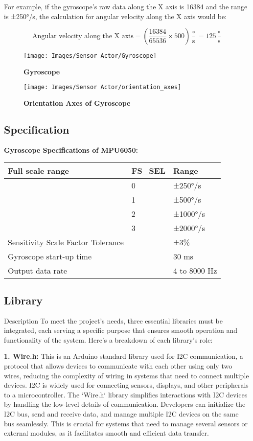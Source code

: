 For example, if the gyroscope's raw data along the X axis is 16384 and the range is ±250°/s, the calculation for angular velocity along the X axis would be:

$$ \text{Angular velocity along the X axis} = \left(\frac{16384}{65536} \times 500\right) \frac{\circ}{\text{s}} = 125 \frac{\circ}{\text{s}} $$


\begin{figure}[H]\centering
	\texttt{[image: Images/Sensor Actor/Gyroscope]} 
	\caption{\textbf{Gyroscope}}
	\label{fig:Pin_assignment_of_Arduino_Nano_33_BLE_Sense} 
\end{figure}
\begin{figure}[H]\centering
	\texttt{[image: Images/Sensor Actor/orientation\_axes]} 
	\caption{\textbf{Orientation Axes of Gyroscope}}
	\label{fig:Pin_assignment_of_Arduino_Nano_33_BLE_Sense} 
\end{figure}
\subsection{Specification}

	\textbf{Gyroscope Specifications of MPU6050:}\newline
	\begin{tabular}{|l|l|l|}
		\hline
		Full scale range & FS\_SEL & Range \\ \hline
		& 0 & ±250°/s \\ \hline
		& 1 & ±500°/s \\ \hline
		& 2 & ±1000°/s \\ \hline
		& 3 & ±2000°/s \\ \hline
		Sensitivity Scale Factor Tolerance & & ±3\% \\ \hline
		Gyroscope start-up time && 30 ms \\ \hline
		Output data rate & & 4 to 8000 Hz \\ \hline
	\end{tabular}

\subsection{Library}

{Description}
To meet the project's needs, three essential libraries must be integrated, each serving a specific purpose that ensures smooth operation and functionality of the system. Here's a breakdown of each library’s role:

\textbf{1. Wire.h:}
   This is an Arduino standard library used for I2C communication, a protocol that allows devices to communicate with each other using only two wires, reducing the complexity of wiring in systems that need to connect multiple devices. I2C is widely used for connecting sensors, displays, and other peripherals to a microcontroller. The `Wire.h` library simplifies interactions with I2C devices by handling the low-level details of communication. Developers can initialize the I2C bus, send and receive data, and manage multiple I2C devices on the same bus seamlessly. This is crucial for systems that need to manage several sensors or external modules, as it facilitates smooth and efficient data transfer.\cite{Passaro:2017}

